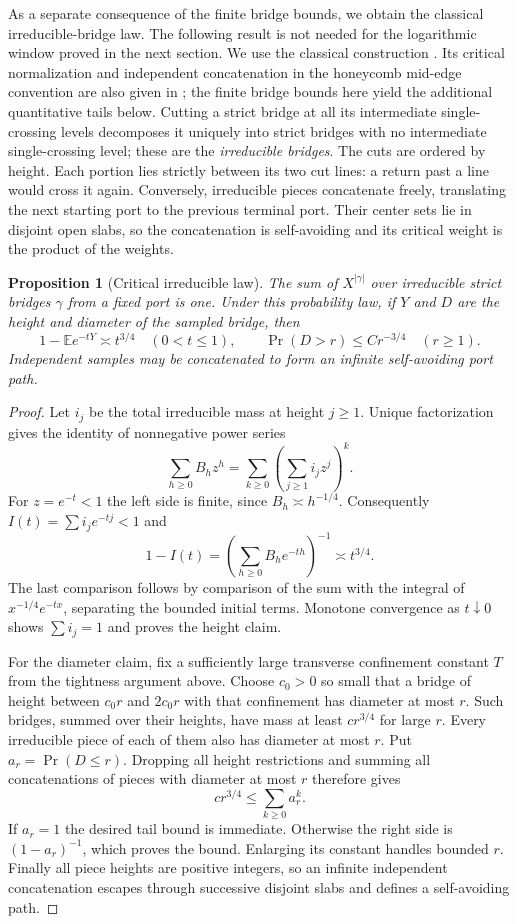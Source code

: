 \documentclass[11pt]{article}
\numberwithin{equation}{section}
\newtheorem{proposition}[theorem]{Proposition}
\theoremstyle{definition}\newtheorem{definition}[theorem]{Definition}
\theoremstyle{remark}\newtheorem{remark}[theorem]{Remark}
\begin{document}
As a separate consequence of the finite bridge bounds, we obtain the
classical irreducible-bridge law. The following result is not needed for
the logarithmic window proved in the next section. We use the classical
construction \cite{Kesten1963,MadrasSlade1993}. Its critical normalization
and independent concatenation in the honeycomb mid-edge convention are
also given in \cite[Appendix]{BeatonEtAl2014}; the finite bridge bounds
here yield the additional quantitative tails below.
Cutting a strict bridge at all its intermediate single-crossing levels
decomposes it uniquely into strict bridges with no intermediate
single-crossing level; these are the \emph{irreducible bridges}. The cuts are ordered by height.
Each portion lies strictly between its two cut lines: a return past a
line would cross it again. Conversely, irreducible pieces concatenate
freely, translating the next starting port to the previous terminal
port. Their center sets lie in disjoint open slabs, so the concatenation
is self-avoiding and its critical weight is the product of the weights.

\begin{proposition}[Critical irreducible law]\label{L:prop:irreducible}
The sum of $X^{|\gamma|}$ over irreducible strict bridges $\gamma$ from a
fixed port is one. Under this probability law, if $Y$ and $D$ are the
height and diameter of the sampled bridge, then
\[
 1-\mathbb E e^{-tY}\asymp t^{3/4}\quad(0<t\le1),\qquad
 \Pr(D>r)\le C r^{-3/4}\quad(r\ge1).
\]
Independent samples may be concatenated to form an infinite
self-avoiding port path.
\end{proposition}
\begin{proof}
Let $i_j$ be the total irreducible mass at height $j\ge1$. Unique
factorization gives the identity of nonnegative power series
\[
 \sum_{h\ge0}B_hz^h=\sum_{k\ge0}\left(\sum_{j\ge1}i_jz^j\right)^k.
\]
For $z=e^{-t}<1$ the left side is finite, since $B_h\asymp h^{-1/4}$.
Consequently $I(t)=\sum i_j e^{-tj}<1$ and
\[
 1-I(t)=\left(\sum_{h\ge0}B_he^{-th}\right)^{-1}\asymp t^{3/4}.
\]
The last comparison follows by comparison of the sum with the integral
of $x^{-1/4}e^{-tx}$, separating the bounded initial terms. Monotone
convergence as $t\downarrow0$ shows $\sum i_j=1$ and proves the height
claim.

For the diameter claim, fix a sufficiently large transverse confinement
constant $T$ from the tightness argument above. Choose $c_0>0$ so small
that a bridge of height between $c_0r$ and $2c_0r$ with that confinement
has diameter at most $r$. Such bridges, summed over their heights, have
mass at least $c r^{3/4}$ for large $r$. Every irreducible piece of each
of them also has diameter at most $r$. Put $a_r=\Pr(D\le r)$. Dropping
all height restrictions and summing all concatenations of pieces with
diameter at most $r$ therefore gives
\[
 c r^{3/4}\le\sum_{k\ge0}a_r^k.
\]
If $a_r=1$ the desired tail bound is immediate. Otherwise the right side
is $(1-a_r)^{-1}$, which proves the bound. Enlarging its constant handles
bounded $r$. Finally all piece heights are positive integers, so an
infinite independent concatenation escapes through successive disjoint
slabs and defines a self-avoiding path.
\end{proof}
\end{document}
